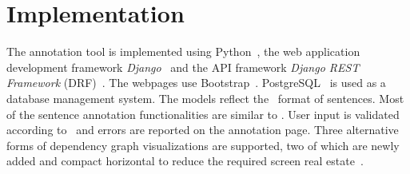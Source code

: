 \section{Implementation}
\label{sec:implementation}

The annotation tool is implemented using Python~\cite{python}, the web application development framework \textit{Django}~\cite{django} and the API framework \textit{Django REST Framework} (DRF)~\cite{drf}. The webpages use Bootstrap~\cite{bootstrap}.
PostgreSQL~\cite{psql} is used as a database management system.
The models reflect the \ud\ format of sentences.
Most of the sentence annotation functionalities are similar to \boatvone.
User input is validated according to \ud\ and errors are reported on the annotation page.
Three alternative forms of dependency graph visualizations are supported, two of which are newly added and compact horizontal to reduce the required screen real estate~\cite{spacy,spyssalo}.

